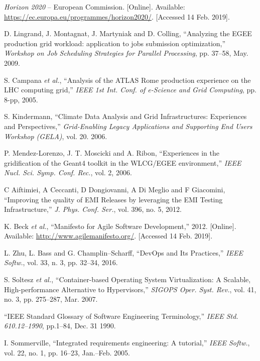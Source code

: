 \begin{thebibliography}{1}

\emph{Horizon 2020} -- European Commission.
[Online]. Available: \url{https://ec.europa.eu/programmes/horizon2020/}.
[Accessed 14 Feb. 2019].

D. Lingrand, J. Montagnat, J. Martyniak and D. Colling,
``Analyzing the EGEE production grid workload: application to jobs submission optimization,''
\emph{Workshop on Job Scheduling Strategies for Parallel Processing},
pp. 37--58, May. 2009.

S. Campana  \emph{et al.},
``Analysis of the ATLAS Rome production experience on the LHC computing grid,''
\emph{IEEE 1st Int. Conf. of e-Science and Grid Computing},
pp. 8-pp, 2005.

S. Kindermann,
``Climate Data Analysis and Grid Infrastructures: Experiences and Perspectives,''
\emph{Grid-Enabling Legacy Applications and Supporting End Users Workshop (GELA)},
vol. 20. 2006.

P. Mendez-Lorenzo, J. T. Moscicki and A. Ribon,
``Experiences in the gridification of the Geant4 toolkit in the WLCG/EGEE environment,''
\emph{IEEE Nucl. Sci. Symp. Conf. Rec.},
vol. 2, 2006.

C Aiftimiei, A Ceccanti, D Dongiovanni, A Di Meglio and F Giacomini,
``Improving the quality of EMI Releases by leveraging the EMI Testing Infrastructure,''
\emph{J. Phys. Conf. Ser.},
vol. 396, no. 5, 2012.

K. Beck \emph{et al.},
``Manifesto for Agile Software Development,'' 2012.
[Online]. Available: \url{http://www.agilemanifesto.org/}.
[Accessed 14 Feb. 2019].

L. Zhu, L. Bass and G. Champlin--Scharff,
``DevOps and Its Practices,''
\emph{IEEE Softw.},
vol. 33, n. 3, pp. 32--34, 2016.

S. Soltesz \emph{et al.},
``Container-based Operating System Virtualization: A Scalable, High-performance Alternative to Hypervisors,''
\emph{SIGOPS Oper. Syst. Rev.},
vol. 41, no. 3, pp. 275--287, Mar. 2007.

``IEEE Standard Glossary of Software Engineering Terminology,''
\emph{IEEE Std. 610.12--1990}, pp.1--84, Dec. 31 1990.

I. Sommerville,
``Integrated requirements engineering: A tutorial,''
\emph{IEEE Softw.}, vol. 22, no. 1, pp. 16--23, Jan.--Feb. 2005.


\end{thebibliography}
